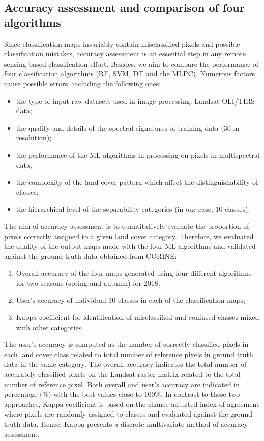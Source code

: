 \documentclass[jimaging,article,submit,pdftex,moreauthors]{Definitions/mdpi}
\begin{document}
\subsection{Accuracy assessment and comparison of four algorithms}

Since classification maps invariably contain misclassified pixels and possible classification mistakes, accuracy assessment is an essential step in any remote sensing-based classification effort. Besides, we aim to compare the performance of four classification algorithms (RF, SVM, DT and {the} MLPC). Numerous factors cause possible errors, including the following ones:
\begin{itemize} 
	\item the type of input raw datasets used in image processing: Landsat OLI/TIRS data;
	\item the quality and details of the spectral signatures of training data (30-m resolution);
	\item the performance of the ML algorithms in processing on pixels in multispectral data;
	\item the complexity of the land cover pattern which affect the distinguishability of classes;
	\item the hierarchical level of the separability categories (in our case, 10 classes).
\end{itemize} 
	
The aim of accuracy assessment is to  {quantitatively evaluate the proportion of pixels correctly assigned to a given land cover category}. Therefore, we evaluated the quality of the {output maps made with the four ML algorithms and validated against the ground truth data obtained from CORINE}:
\begin{enumerate}
	\item Overall accuracy of the four maps generated using four different algorithms for two seasons (spring and autumn) {for 2018};
	\item User's accuracy of individual 10 classes in each of the classification maps;
	\item Kappa coefficient for identification of misclassified and confused classes mixed with other categories.
\end{enumerate}

The user's accuracy is computed as the number of correctly classified pixels in each land cover class related to total number of reference pixels in {ground truth} data in the same category. The overall accuracy indicates the total number of accurately classified pixels on the Landsat raster matrix related to the total number of reference pixel. Both overall and user's accuracy are indicated in percentage (\%) with the best values close to 100\%. In contrast to these two approaches, Kappa coefficient is based on the chance-adjusted index of agreement where pixels are randomly assigned to classes and evaluated against the ground truth data. Hence, Kappa presents a discrete multivariate method of accuracy assessment. 
\end{document}
